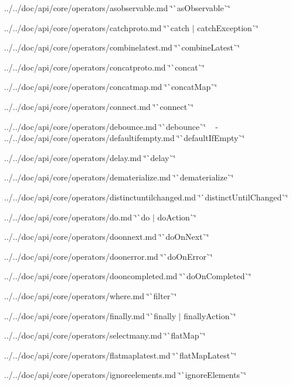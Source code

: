 \begin{DoxyItemize}
\item ../../doc/api/core/operators/asobservable.md \char`\"{}\`{}as\+Observable\`{}\char`\"{}
\item ../../doc/api/core/operators/catchproto.md \char`\"{}\`{}catch $\vert$ catch\+Exception\`{}\char`\"{}
\item ../../doc/api/core/operators/combinelatest.md \char`\"{}\`{}combine\+Latest\`{}\char`\"{}
\item ../../doc/api/core/operators/concatproto.md \char`\"{}\`{}concat\`{}\char`\"{}
\item ../../doc/api/core/operators/concatmap.md \char`\"{}\`{}concat\+Map\`{}\char`\"{}
\item ../../doc/api/core/operators/connect.md \char`\"{}\`{}connect\`{}\char`\"{}
\item ../../doc/api/core/operators/debounce.md \char`\"{}\`{}debounce\`{}\char`\"{} ~\newline
-\/ ../../doc/api/core/operators/defaultifempty.md \char`\"{}\`{}default\+If\+Empty\`{}\char`\"{}
\item ../../doc/api/core/operators/delay.md \char`\"{}\`{}delay\`{}\char`\"{}
\item ../../doc/api/core/operators/dematerialize.md \char`\"{}\`{}dematerialize\`{}\char`\"{}
\item ../../doc/api/core/operators/distinctuntilchanged.md \char`\"{}\`{}distinct\+Until\+Changed\`{}\char`\"{}
\item ../../doc/api/core/operators/do.md \char`\"{}\`{}do $\vert$ do\+Action\`{}\char`\"{}
\item ../../doc/api/core/operators/doonnext.md \char`\"{}\`{}do\+On\+Next\`{}\char`\"{}
\item ../../doc/api/core/operators/doonerror.md \char`\"{}\`{}do\+On\+Error\`{}\char`\"{}
\item ../../doc/api/core/operators/dooncompleted.md \char`\"{}\`{}do\+On\+Completed\`{}\char`\"{}
\item ../../doc/api/core/operators/where.md \char`\"{}\`{}filter\`{}\char`\"{}
\item ../../doc/api/core/operators/finally.md \char`\"{}\`{}finally $\vert$ finally\+Action\`{}\char`\"{}
\item ../../doc/api/core/operators/selectmany.md \char`\"{}\`{}flat\+Map\`{}\char`\"{}
\item ../../doc/api/core/operators/flatmaplatest.md \char`\"{}\`{}flat\+Map\+Latest\`{}\char`\"{}
\item ../../doc/api/core/operators/ignoreelements.md \char`\"{}\`{}ignore\+Elements\`{}\char`\"{}

\end{DoxyItemize}
